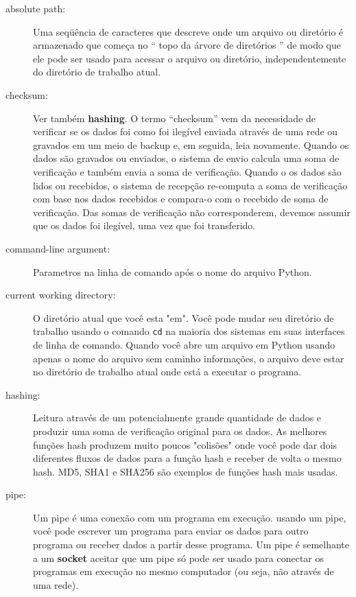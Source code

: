 \begin{description}

\item[absolute path:] Uma seqüência de caracteres que descreve onde um arquivo ou
diretório é armazenado que começa no `` topo da árvore de diretórios ''
de modo que ele pode ser usado para acessar o arquivo ou diretório, independentemente
do diretório de trabalho atual.

\item [checksum:] Ver também {\bf hashing}. O termo ``checksum''
vem da necessidade de verificar se os dados foi como foi ilegível
enviada através de uma rede ou gravados em um meio de backup e, em seguida,
leia novamente. Quando os dados são gravados ou enviados, o sistema de envio
calcula uma soma de verificação e também envia a soma de verificação. Quando o
os dados são lidos ou recebidos, o sistema de recepção re-computa
a soma de verificação com base nos dados recebidos e compara-o com o
recebido de soma de verificação. Das somas de verificação não corresponderem, devemos
assumir que os dados foi ilegível, uma vez que foi transferido.

\item[command-line argument:] Parametros na linha de comando após o nome do arquivo Python.

\item[current working directory:] O diretório atual que você
esta "em". Você pode mudar seu diretório de trabalho usando o
comando {\tt cd} na maioria dos sistemas em suas interfaces de linha de comando.
Quando você abre um arquivo em Python usando apenas o nome do arquivo sem caminho
informações, o arquivo deve estar no diretório de trabalho atual
onde está a executar o programa.


\item[hashing:] Leitura através de um potencialmente grande quantidade de dados
e produzir uma soma de verificação original para os dados. As melhores funções hash
produzem muito poucos "colisões" onde você pode dar dois diferentes
fluxos de dados para a função hash e receber de volta o mesmo hash.
MD5, SHA1 e SHA256 são exemplos de funções hash mais usadas.

\item[pipe:] Um pipe é uma conexão com um programa em execução. usando
um pipe, você pode escrever um programa para enviar os dados para outro programa
ou receber dados a partir desse programa. Um pipe é semelhante a um
{\bf socket} aceitar que um pipe só pode ser usado para
conectar os programas em execução no mesmo computador (ou seja, não
através de uma rede).


\end{description}
